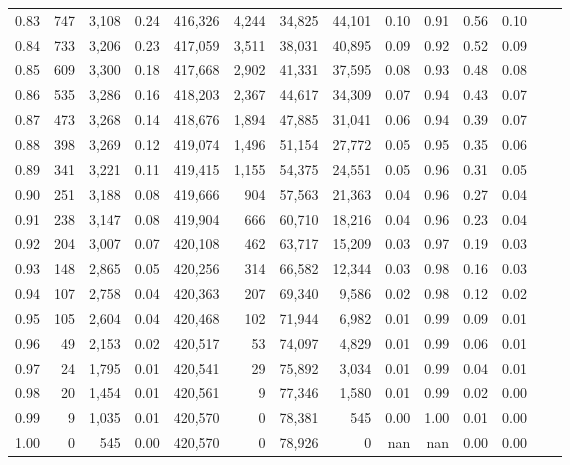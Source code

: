 \begin{tabular}{rrrrrrrrrrrrrr}
0.83 &    747 &  3,108 &     0.24 &  416,326 &    4,244 &  34,825 &  44,101 &  0.10 &  0.91 &  0.56 &      0.10 \\
0.84 &    733 &  3,206 &     0.23 &  417,059 &    3,511 &  38,031 &  40,895 &  0.09 &  0.92 &  0.52 &      0.09 \\
0.85 &    609 &  3,300 &     0.18 &  417,668 &    2,902 &  41,331 &  37,595 &  0.08 &  0.93 &  0.48 &      0.08 \\
0.86 &    535 &  3,286 &     0.16 &  418,203 &    2,367 &  44,617 &  34,309 &  0.07 &  0.94 &  0.43 &      0.07 \\
0.87 &    473 &  3,268 &     0.14 &  418,676 &    1,894 &  47,885 &  31,041 &  0.06 &  0.94 &  0.39 &      0.07 \\
0.88 &    398 &  3,269 &     0.12 &  419,074 &    1,496 &  51,154 &  27,772 &  0.05 &  0.95 &  0.35 &      0.06 \\
0.89 &    341 &  3,221 &     0.11 &  419,415 &    1,155 &  54,375 &  24,551 &  0.05 &  0.96 &  0.31 &      0.05 \\
0.90 &    251 &  3,188 &     0.08 &  419,666 &      904 &  57,563 &  21,363 &  0.04 &  0.96 &  0.27 &      0.04 \\
0.91 &    238 &  3,147 &     0.08 &  419,904 &      666 &  60,710 &  18,216 &  0.04 &  0.96 &  0.23 &      0.04 \\
0.92 &    204 &  3,007 &     0.07 &  420,108 &      462 &  63,717 &  15,209 &  0.03 &  0.97 &  0.19 &      0.03 \\
0.93 &    148 &  2,865 &     0.05 &  420,256 &      314 &  66,582 &  12,344 &  0.03 &  0.98 &  0.16 &      0.03 \\
0.94 &    107 &  2,758 &     0.04 &  420,363 &      207 &  69,340 &   9,586 &  0.02 &  0.98 &  0.12 &      0.02 \\
0.95 &    105 &  2,604 &     0.04 &  420,468 &      102 &  71,944 &   6,982 &  0.01 &  0.99 &  0.09 &      0.01 \\
0.96 &     49 &  2,153 &     0.02 &  420,517 &       53 &  74,097 &   4,829 &  0.01 &  0.99 &  0.06 &      0.01 \\
0.97 &     24 &  1,795 &     0.01 &  420,541 &       29 &  75,892 &   3,034 &  0.01 &  0.99 &  0.04 &      0.01 \\
0.98 &     20 &  1,454 &     0.01 &  420,561 &        9 &  77,346 &   1,580 &  0.01 &  0.99 &  0.02 &      0.00 \\
0.99 &      9 &  1,035 &     0.01 &  420,570 &        0 &  78,381 &     545 &  0.00 &  1.00 &  0.01 &      0.00 \\
1.00 &      0 &    545 &     0.00 &  420,570 &        0 &  78,926 &       0 &   nan &   nan &  0.00 &      0.00 \\
\bottomrule
\end{tabular}
